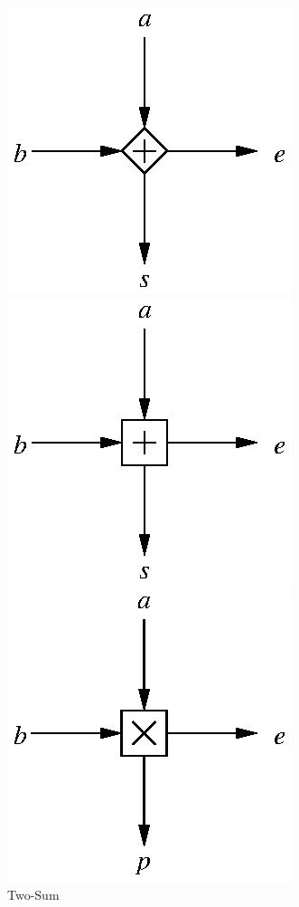 \documentclass[11pt]{article}
\theoremstyle{definition}
\begin{document}
\begin{figure}
  \hfill
  \begin{minipage}[t]{2in}
    \begin{center}
      \includegraphics{quick-two-sum.eps}
      \caption{\label{quick_two_sum_fig}{\sc Quick-Two-Sum}}
    \end{center}
  \end{minipage}
  \begin{minipage}[t]{2in}
    \begin{center}
      \includegraphics{two-sum.eps}
      \caption{\label{two_sum_fig}{\sc Two-Sum}}
    \end{center}
  \end{minipage}
  \begin{minipage}[t]{2in}
    \begin{center}
      \includegraphics{two-prod.eps}

\end{center}
\end{minipage}
\end{figure}
\end{document}
